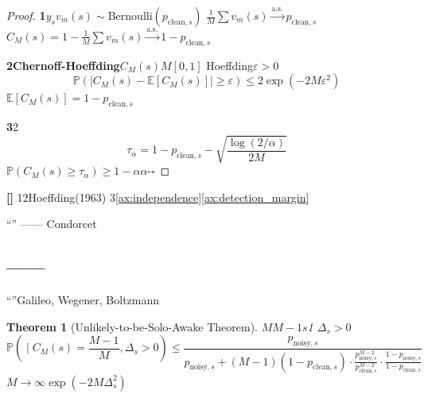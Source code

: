 \documentclass[11pt,a4paper]{article}
\newtheorem{theorem}{Theorem}[section]
\theoremstyle{remark}
\newcommand{\rigorous}{\textnormal{\textbf{[]}}}
\begin{document}
\begin{proof}
\textbf{1}$y_s$$v_m(s) \sim \text{Bernoulli}(p_{\text{clean}, s})$
$\frac{1}{M}\sum v_m(s) \xrightarrow{\text{a.s.}} p_{\text{clean}, s}$
$C_M(s) = 1 - \frac{1}{M}\sum v_m(s) \xrightarrow{\text{a.s.}} 1 - p_{\text{clean}, s}$

\textbf{2Chernoff-Hoeffding}$C_M(s)$$M$$[0,1]$
Hoeffding$\varepsilon > 0$
\begin{equation}
    \mathbb{P}\left(|C_M(s) - \mathbb{E}[C_M(s)]| \geq \varepsilon\right)
    \leq 2\exp\left(-2M\varepsilon^2\right)
\end{equation}
$\mathbb{E}[C_M(s)] = 1 - p_{\text{clean}, s}$

\textbf{3}2
\begin{equation}
    \tau_\alpha = 1 - p_{\text{clean}, s} - \sqrt{\frac{\log(2/\alpha)}{2M}}
\end{equation}
$\mathbb{P}(C_M(s) \geq \tau_\alpha) \geq 1 - \alpha$$\alpha$-\hfill $\square$
\end{proof}

\rigorous{} \textbf{}12Hoeffding(1963)
3\ref{ax:independence}\ref{ax:detection_margin}

\textbf{}``''
——
Condorcet

\subsection{——}

``''Galileo, Wegener, Boltzmann


\begin{theorem}[Unlikely-to-be-Solo-Awake Theorem]
\label{thm:solo_awake}
$M$$M-1$$s$1
$\Delta_s > 0$
\begin{equation}
    \boxed{\mathbb{P}\left(\text{} \mid C_M(s) = \frac{M-1}{M}, \Delta_s > 0\right)
    \leq \frac{p_{\text{noisy}, s}}{p_{\text{noisy}, s} + (M-1)(1-p_{\text{clean}, s})\cdot
    \frac{p_{\text{noisy}, s}^{M-2}}{p_{\text{clean}, s}^{M-2}} \cdot \frac{1-p_{\text{noisy}, s}}{1-p_{\text{clean}, s}}}
    }
\end{equation}
$M \to \infty$$\exp(-2M\Delta_s^2)$
\end{theorem}
\end{document}
